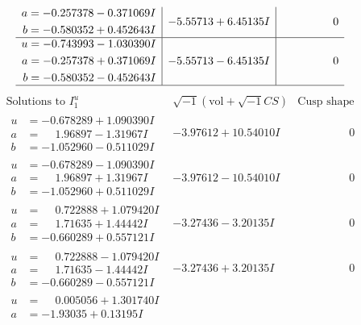 \documentclass[1p]{elsarticle_modified}
\theoremstyle{definition}
\newcommand{\I}{\sqrt{-1}}
\begin{document}
$$\begin{array}{c|c|c}
\begin{aligned}
a &= -0.257378 - 0.371069 I \\
b &= -0.580352 + 0.452643 I\end{aligned}
 & -5.55713 + 6.45135 I & \phantom{-0.000000 } 0 \\ \hline\begin{aligned}
u &= -0.743993 - 1.030390 I \\
a &= -0.257378 + 0.371069 I \\
b &= -0.580352 - 0.452643 I\end{aligned}
 & -5.55713 - 6.45135 I & \phantom{-0.000000 } 0\\
 \hline 
 \end{array}$$\newpage$$\begin{array}{c|c|c}  
\text{Solutions to }I^u_{1}& \I (\text{vol} + \sqrt{-1}CS) & \text{Cusp shape}\\
 \hline 
\begin{aligned}
u &= -0.678289 + 1.090390 I \\
a &= \phantom{-}1.96897 - 1.31967 I \\
b &= -1.052960 - 0.511029 I\end{aligned}
 & -3.97612 + 10.54010 I & \phantom{-0.000000 } 0 \\ \hline\begin{aligned}
u &= -0.678289 - 1.090390 I \\
a &= \phantom{-}1.96897 + 1.31967 I \\
b &= -1.052960 + 0.511029 I\end{aligned}
 & -3.97612 - 10.54010 I & \phantom{-0.000000 } 0 \\ \hline\begin{aligned}
u &= \phantom{-}0.722888 + 1.079420 I \\
a &= \phantom{-}1.71635 + 1.44442 I \\
b &= -0.660289 + 0.557121 I\end{aligned}
 & -3.27436 - 3.20135 I & \phantom{-0.000000 } 0 \\ \hline\begin{aligned}
u &= \phantom{-}0.722888 - 1.079420 I \\
a &= \phantom{-}1.71635 - 1.44442 I \\
b &= -0.660289 - 0.557121 I\end{aligned}
 & -3.27436 + 3.20135 I & \phantom{-0.000000 } 0 \\ \hline\begin{aligned}
u &= \phantom{-}0.005056 + 1.301740 I \\
a &= -1.93035 + 0.13195 I \\

\end{aligned}
\end{array}$$
\end{document}
